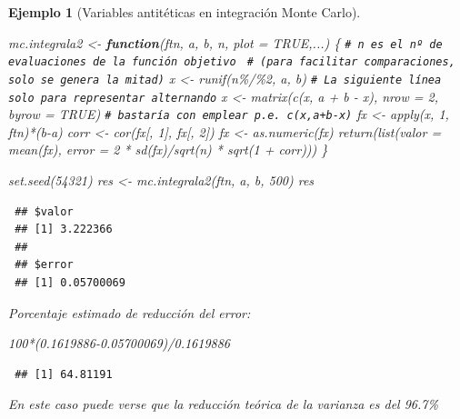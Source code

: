\documentclass[
]{book}
\newenvironment{Shaded}{\begin{snugshade}}{\end{snugshade}}
\newcommand{\AttributeTok}[1]{\textcolor[rgb]{0.77,0.63,0.00}{#1}}
\newcommand{\CommentTok}[1]{\textcolor[rgb]{0.56,0.35,0.01}{\textit{#1}}}
\newcommand{\ConstantTok}[1]{\textcolor[rgb]{0.00,0.00,0.00}{#1}}
\newcommand{\ControlFlowTok}[1]{\textcolor[rgb]{0.13,0.29,0.53}{\textbf{#1}}}
\newcommand{\DecValTok}[1]{\textcolor[rgb]{0.00,0.00,0.81}{#1}}
\newcommand{\FloatTok}[1]{\textcolor[rgb]{0.00,0.00,0.81}{#1}}
\newcommand{\FunctionTok}[1]{\textcolor[rgb]{0.00,0.00,0.00}{#1}}
\newcommand{\NormalTok}[1]{#1}
\newcommand{\OtherTok}[1]{\textcolor[rgb]{0.56,0.35,0.01}{#1}}
\newcommand{\SpecialCharTok}[1]{\textcolor[rgb]{0.00,0.00,0.00}{#1}}
\theoremstyle{break}
\newtheorem{example}{Ejemplo}[chapter]
\theoremstyle{nonumberplain}
\renewcommand{\CommentTok}[1]{\textcolor[rgb]{0.41,0.41,0.41}{\texttt{#1}}}
\begin{document}
\begin{example}[Variables antitéticas en integración Monte Carlo]
\begin{Shaded}
\begin{Highlighting}[]
\NormalTok{mc.integrala2 }\OtherTok{\textless{}{-}} \ControlFlowTok{function}\NormalTok{(ftn, a, b, n, }\AttributeTok{plot =} \ConstantTok{TRUE}\NormalTok{,...) \{}
  \CommentTok{\# n es el nº de evaluaciones de la función objetivo }
  \CommentTok{\# (para facilitar comparaciones, solo se genera la mitad)}
\NormalTok{  x }\OtherTok{\textless{}{-}} \FunctionTok{runif}\NormalTok{(n}\SpecialCharTok{\%/\%}\DecValTok{2}\NormalTok{, a, b)}
  \CommentTok{\# La siguiente línea solo para representar alternando}
\NormalTok{  x }\OtherTok{\textless{}{-}} \FunctionTok{matrix}\NormalTok{(}\FunctionTok{c}\NormalTok{(x, a }\SpecialCharTok{+}\NormalTok{ b }\SpecialCharTok{{-}}\NormalTok{ x), }\AttributeTok{nrow =} \DecValTok{2}\NormalTok{, }\AttributeTok{byrow =} \ConstantTok{TRUE}\NormalTok{)}
  \CommentTok{\# bastaría con emplear p.e. c(x,a+b{-}x)}
\NormalTok{  fx }\OtherTok{\textless{}{-}} \FunctionTok{apply}\NormalTok{(x, }\DecValTok{1}\NormalTok{,  ftn)}\SpecialCharTok{*}\NormalTok{(b}\SpecialCharTok{{-}}\NormalTok{a)}
\NormalTok{  corr }\OtherTok{\textless{}{-}} \FunctionTok{cor}\NormalTok{(fx[, }\DecValTok{1}\NormalTok{], fx[, }\DecValTok{2}\NormalTok{])}
\NormalTok{  fx }\OtherTok{\textless{}{-}} \FunctionTok{as.numeric}\NormalTok{(fx)}
  \FunctionTok{return}\NormalTok{(}\FunctionTok{list}\NormalTok{(}\AttributeTok{valor =} \FunctionTok{mean}\NormalTok{(fx), }\AttributeTok{error =} \DecValTok{2} \SpecialCharTok{*} \FunctionTok{sd}\NormalTok{(fx)}\SpecialCharTok{/}\FunctionTok{sqrt}\NormalTok{(n) }\SpecialCharTok{*} \FunctionTok{sqrt}\NormalTok{(}\DecValTok{1} \SpecialCharTok{+}\NormalTok{ corr)))}
\NormalTok{\}}

\FunctionTok{set.seed}\NormalTok{(}\DecValTok{54321}\NormalTok{)}
\NormalTok{res }\OtherTok{\textless{}{-}} \FunctionTok{mc.integrala2}\NormalTok{(ftn, a, b, }\DecValTok{500}\NormalTok{)}
\NormalTok{res}
\end{Highlighting}
\end{Shaded}

\begin{verbatim}
 ## $valor
 ## [1] 3.222366
 ## 
 ## $error
 ## [1] 0.05700069
\end{verbatim}

Porcentaje estimado de reducción del error:

\begin{Shaded}
\begin{Highlighting}[]
\DecValTok{100}\SpecialCharTok{*}\NormalTok{(}\FloatTok{0.1619886{-}0.05700069}\NormalTok{)}\SpecialCharTok{/}\FloatTok{0.1619886}
\end{Highlighting}
\end{Shaded}

\begin{verbatim}
 ## [1] 64.81191
\end{verbatim}

En este caso puede verse que la reducción teórica de la varianza es del 96.7\%
\end{example}
\end{document}
